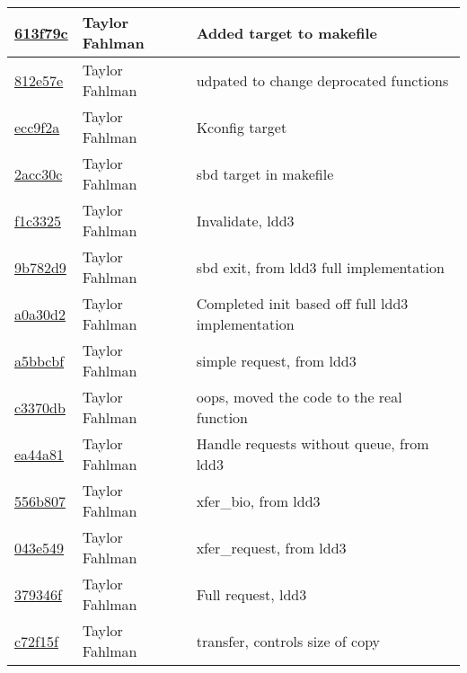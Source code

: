 \begin{tabular}{l l l}
\href{https://github.com/fahlmant/cs444/commit/613f79c8756dc8338c7749a141e23f270ec615fd}{613f79c} & Taylor Fahlman & Added target to makefile\\\hline
\href{https://github.com/fahlmant/cs444/commit/812e57e06b0a842babf05c78b43413c10697b97e}{812e57e} & Taylor Fahlman & udpated to change deprocated functions\\\hline
\href{https://github.com/fahlmant/cs444/commit/ecc9f2a339b8b574a762b1329a18bb9cd677318e}{ecc9f2a} & Taylor Fahlman & Kconfig target\\\hline
\href{https://github.com/fahlmant/cs444/commit/2acc30cce09a4737ddc47dae0858626e3452e5d3}{2acc30c} & Taylor Fahlman & sbd target in makefile\\\hline
\href{https://github.com/fahlmant/cs444/commit/f1c33256670dd241e6017234879534c7039a3032}{f1c3325} & Taylor Fahlman & Invalidate, ldd3\\\hline
\href{https://github.com/fahlmant/cs444/commit/9b782d93b8f054a5c1cf1e61b5cf40183f3857e7}{9b782d9} & Taylor Fahlman & sbd exit, from ldd3 full implementation\\\hline
\href{https://github.com/fahlmant/cs444/commit/a0a30d2c9c9fd9f76993f86a59a6195c571db27b}{a0a30d2} & Taylor Fahlman & Completed init based off full ldd3 implementation\\\hline
\href{https://github.com/fahlmant/cs444/commit/a5bbcbfe1f20b45f2902911217caeead7b5230e9}{a5bbcbf} & Taylor Fahlman & simple request, from ldd3\\\hline
\href{https://github.com/fahlmant/cs444/commit/c3370db316fc781f54c9b53345cd596653ce68d3}{c3370db} & Taylor Fahlman & oops, moved the code to the real function\\\hline
\href{https://github.com/fahlmant/cs444/commit/ea44a818a5d009be8ea588c0457ee154adadd8fe}{ea44a81} & Taylor Fahlman & Handle requests without queue, from ldd3\\\hline
\href{https://github.com/fahlmant/cs444/commit/556b807f9df3c2511c99834f90a7db474be95ed6}{556b807} & Taylor Fahlman & xfer_bio, from ldd3\\\hline
\href{https://github.com/fahlmant/cs444/commit/043e5496aa11e70af81a109354acf313e04546f3}{043e549} & Taylor Fahlman & xfer_request, from ldd3\\\hline
\href{https://github.com/fahlmant/cs444/commit/379346f09f81f25716488cb6f078b36eb55ad95b}{379346f} & Taylor Fahlman & Full request, ldd3\\\hline
\href{https://github.com/fahlmant/cs444/commit/c72f15f69feb16d4c5c931a1ac1fa7bee9f50e54}{c72f15f} & Taylor Fahlman & transfer, controls size of copy\\\hline

\end{tabular}
